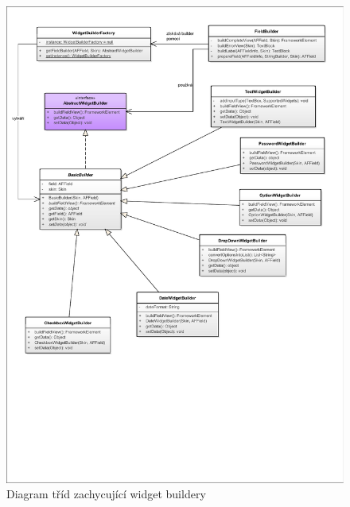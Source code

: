 \begin{figure}
\begin{center}
\includegraphics[width=\textwidth, height=\textheight, keepaspectratio]{figures/factoryWidgetBuilders}
\caption{Diagram tříd zachycující widget buildery}
\label{img:factoryWidgetBuilders}
\end{center}
\end{figure}

